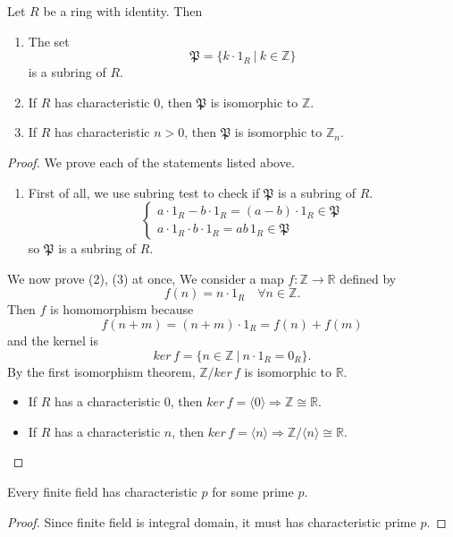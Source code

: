 \begin{theorem}
    Let $R$ be a ring with identity. Then 
    \begin{enumerate}
        \item The set 
        \[
            \mathfrak{P} = \{ k \cdot 1_R \> | \> k \in \mathbb{Z} \}
        \]
         is a subring of $R$.
        \item If $R$ has characteristic $0$, then $\mathfrak{P}$ is isomorphic to $\mathbb{Z}$.
        \item If $R$ has characteristic $n > 0$, then $\mathfrak{P}$ is isomorphic to $\mathbb{Z}_n$.
    \end{enumerate}
\end{theorem}
\begin{proof}
    We prove each of the statements listed above.
    \begin{enumerate}
        \item First of all, we use subring test to check if $\mathfrak{P}$ is a subring of $R$.
        \[
            \begin{cases}
                a \cdot 1_R - b \cdot 1_R = (a-b) \cdot 1_R \in \mathfrak{P}\\
                a \cdot 1_R \cdot b \cdot 1_R = ab\, 1_R \in \mathfrak{P}
            \end{cases}
        \]
        so $\mathfrak{P}$ is a subring of $R$. 
    \end{enumerate}

    We now prove (2), (3) at once, We consider a map $f : \mathbb{Z} \to \mathbb{R}$ 
    defined by 
    \[
        f(n) = n \cdot 1_R \quad \forall n \in \mathbb{Z}.
    \] 
    Then $f$ is homomorphism because 
    \[
        f(n + m) = (n + m) \cdot 1_R = f(n) + f(m)
    \]
    and the kernel is 
    \[
        ker\, f = \{ n \in \mathbb{Z} \> | \> n \cdot 1_R = 0_R \}.
    \]
    By the first isomorphism theorem, $\mathbb{Z} / ker\, f$ is isomorphic to $\mathbb{R}$.
    \begin{itemize}
        \item If $R$ has a characteristic $0$, then $ker\, f = \langle 0 \rangle \Longrightarrow \mathbb{Z} \cong \mathbb{R}$.
        \item If $R$ has a characteristic $n$, then $ker\, f = \langle n \rangle \Longrightarrow \mathbb{Z}/\langle n \rangle \cong \mathbb{R}$.
    \end{itemize}
\end{proof}

\begin{corollary}
    Every finite field has characteristic $p$ for some prime $p$.
\end{corollary}
\begin{proof}
    Since finite field is integral domain, it must has characteristic prime $p$.
\end{proof}

